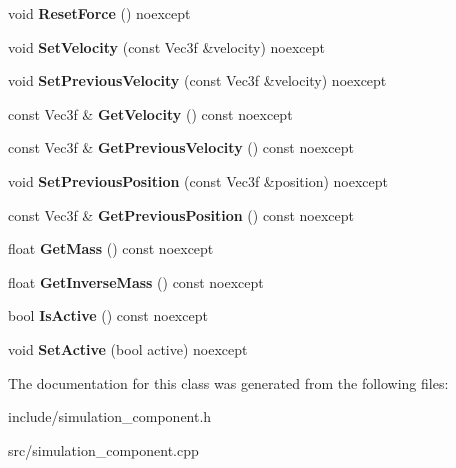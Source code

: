 \begin{DoxyCompactItemize}
void {\bfseries Reset\+Force} () noexcept
\item 
\mbox{\label{class_blade_1_1_simulation_component_a716e37f2b196d1710293d97a3df40a9a}} 
void {\bfseries Set\+Velocity} (const Vec3f \&velocity) noexcept
\item 
\mbox{\label{class_blade_1_1_simulation_component_a1b8b06524b9d125048518791ac18fbe8}} 
void {\bfseries Set\+Previous\+Velocity} (const Vec3f \&velocity) noexcept
\item 
\mbox{\label{class_blade_1_1_simulation_component_ae8706b97a0eb390549912727266c0e66}} 
const Vec3f \& {\bfseries Get\+Velocity} () const noexcept
\item 
\mbox{\label{class_blade_1_1_simulation_component_a6018994ed5b055a6e2bb2721ffb7e6ab}} 
const Vec3f \& {\bfseries Get\+Previous\+Velocity} () const noexcept
\item 
\mbox{\label{class_blade_1_1_simulation_component_ab3adb46aff59622793756e4f3c2f0e5b}} 
void {\bfseries Set\+Previous\+Position} (const Vec3f \&position) noexcept
\item 
\mbox{\label{class_blade_1_1_simulation_component_a4ae4172a5b5d01b049bc5c89f68c825b}} 
const Vec3f \& {\bfseries Get\+Previous\+Position} () const noexcept
\item 
\mbox{\label{class_blade_1_1_simulation_component_ac239be1bec2c4cfe67073c67729e7d69}} 
float {\bfseries Get\+Mass} () const noexcept
\item 
\mbox{\label{class_blade_1_1_simulation_component_a123d3fcaa2243e410252d1b63385b9f3}} 
float {\bfseries Get\+Inverse\+Mass} () const noexcept
\item 
\mbox{\label{class_blade_1_1_simulation_component_ab5fb23774aa5b050e8b830e70128335f}} 
bool {\bfseries Is\+Active} () const noexcept
\item 
\mbox{\label{class_blade_1_1_simulation_component_abddcdcc541d9661d086f503a44f28f44}} 
void {\bfseries Set\+Active} (bool active) noexcept
\end{DoxyCompactItemize}


The documentation for this class was generated from the following files\+:\begin{DoxyCompactItemize}
\item 
include/simulation\+\_\+component.\+h\item 
src/simulation\+\_\+component.\+cpp\end{DoxyCompactItemize}
